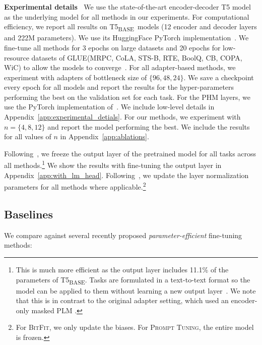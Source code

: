\documentclass{article}
\newcommand{\basebase}{T5\textsubscript{\tiny BASE}\xspace}
\newcommand{\prompttuning}{\textsc{Prompt Tuning}\xspace}
\newcommand{\glue}{\textsc{GLUE}\xspace}
\newcommand{\bitfit}{\textsc{BitFit}\xspace}
\begin{document}
\noindent \textbf{Experimental details} $\:$  
We use the state-of-the-art encoder-decoder T5 model~\citep{raffel2019exploring} as the underlying model for all methods in our experiments. For computational efficiency, we report all results on \basebase~models (12 encoder and decoder layers and 222M parameters). We use its HuggingFace PyTorch implementation~\citep{wolf-etal2020transformers}. We fine-tune all methods for 3 epochs on large datasets and 20 epochs for low-resource datasets of \glue (MRPC, CoLA, STS-B, RTE, BoolQ, CB, COPA, WiC) to allow the models to converge~\citep{zhang2020revisiting}. For all adapter-based methods, we experiment with adapters of bottleneck size of $\{96, 48, 24\}$. We save a checkpoint every epoch for all models and report the results for the hyper-parameters performing the best on the validation set for each task. For the PHM layers, we use the PyTorch implementation of~\citet{le2021parameterized}. We include low-level details in Appendix~\ref{app:experimental_detials}. For our methods, we experiment with $n=\{4, 8, 12\}$ and report the model performing the best. We include the results for all values of $n$ in Appendix~\ref{app:ablations}.

Following~\citet{karimi2021parameter-efficient}, we freeze the output layer of the pretrained model for all tasks across all methods.\footnote{This is much more efficient as the output layer includes 11.1\% of the parameters of \basebase. Tasks are formulated in a text-to-text format so the model can be applied to them without learning a new output layer~\citep{raffel2019exploring}. We note that this is in contrast to the original adapter setting, which used an encoder-only masked PLM \citep{houlsby2019parameter}.} We show the results with fine-tuning the output layer in Appendix~\ref{app:with_lm_head}. Following~\citet{houlsby2019parameter}, we update the layer normalization parameters for all methods where applicable.\footnote{For \bitfit, we only update the biases. For \prompttuning, the entire model is frozen.} 


\vspace{-0.5em}
\subsection{Baselines}

We compare against several recently proposed \emph{parameter-efficient} fine-tuning methods: 
\end{document}
